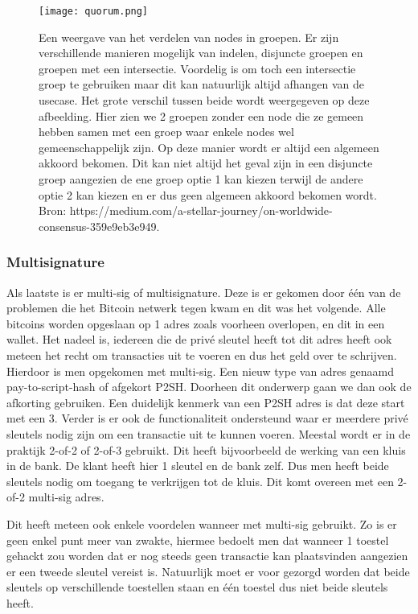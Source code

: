\begin{figure}
	\texttt{[image: quorum.png]}
	\caption{Een weergave van het verdelen van nodes in groepen. Er zijn verschillende manieren mogelijk van indelen, disjuncte groepen en groepen met een intersectie. Voordelig is om toch een intersectie groep te gebruiken maar dit kan natuurlijk altijd afhangen van de usecase. Het grote verschil tussen beide wordt weergegeven op deze afbeelding. Hier zien we 2 groepen zonder een node die ze gemeen hebben samen met een groep waar enkele nodes wel gemeenschappelijk zijn. Op deze manier wordt er altijd een algemeen akkoord bekomen. Dit kan niet altijd het geval zijn in een disjuncte groep aangezien de ene groep optie 1 kan kiezen terwijl de andere optie 2 kan kiezen en er dus geen algemeen akkoord bekomen wordt. Bron: https://medium.com/a-stellar-journey/on-worldwide-consensus-359e9eb3e949.}
	\label{fig:quorum}
\end{figure}

\subsubsection{Multisignature}
Als laatste is er multi-sig of multisignature. Deze is er gekomen door één van de problemen die het Bitcoin netwerk tegen kwam en dit was het volgende. Alle bitcoins worden opgeslaan op 1 adres zoals voorheen overlopen, en dit in een wallet. Het nadeel is, iedereen die de privé sleutel heeft tot dit adres heeft ook meteen het recht om transacties uit te voeren en dus het geld over te schrijven. Hierdoor is men opgekomen met multi-sig. Een nieuw type van adres genaamd pay-to-script-hash of afgekort P2SH. Doorheen dit onderwerp gaan we dan ook de afkorting gebruiken. Een duidelijk kenmerk van een P2SH adres is dat deze start met een 3. Verder is er ook de functionaliteit ondersteund waar er meerdere privé sleutels nodig zijn om een transactie uit te kunnen voeren. Meestal wordt er in de praktijk 2-of-2 of 2-of-3 gebruikt. Dit heeft bijvoorbeeld de werking van een kluis in de bank. De klant heeft hier 1 sleutel en de bank zelf. Dus men heeft beide sleutels nodig om toegang te verkrijgen tot de kluis. Dit komt overeen met een 2-of-2 multi-sig adres. 

Dit heeft meteen ook enkele voordelen wanneer met multi-sig gebruikt. Zo is er geen enkel punt meer van zwakte, hiermee bedoelt men dat wanneer 1 toestel gehackt zou worden dat er nog steeds geen transactie kan plaatsvinden aangezien er een tweede sleutel vereist is. Natuurlijk moet er voor gezorgd worden dat beide sleutels op verschillende toestellen staan en één toestel dus niet beide sleutels heeft. 

